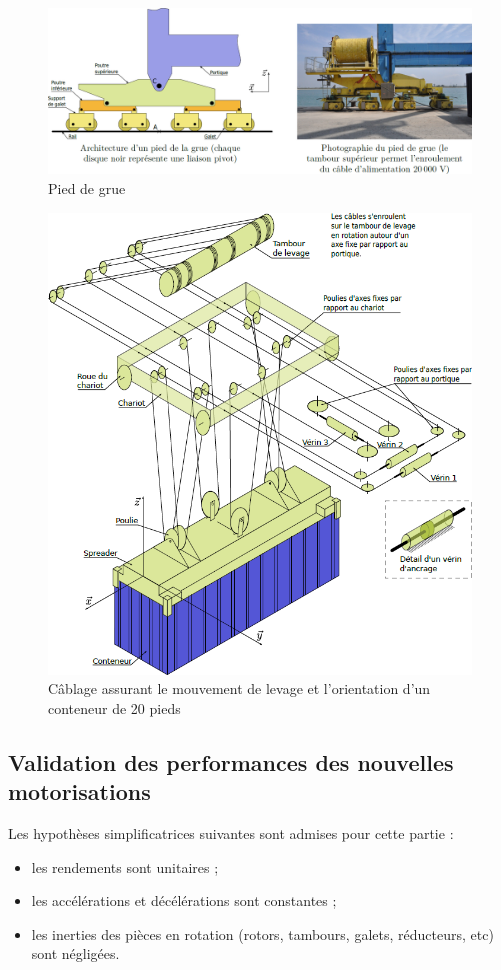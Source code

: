 \documentclass[10pt,fleqn]{article} %
\begin{document}
\begin{figure}[H]
\centering
\includegraphics[width=.8\linewidth]{images/fig_04}
\caption{Pied de grue \label{fig_04}}
\end{figure}

\begin{figure}
\centering
\includegraphics[width=.8\linewidth]{images/fig_05}
\caption{Câblage assurant le mouvement de levage et l’orientation d’un conteneur de 20 pieds \label{fig_05}}
\end{figure}

\subsection{Validation des performances des nouvelles motorisations}
Les hypothèses simplificatrices suivantes sont admises pour cette partie :
\begin{itemize}
\item les rendements sont unitaires ;
\item les accélérations et décélérations sont constantes ;
\item les inerties des pièces en rotation (rotors, tambours, galets, réducteurs, etc) sont négligées.
\end{itemize}
\end{document}
